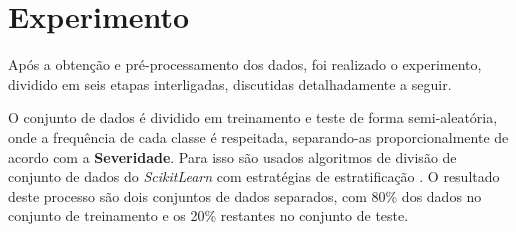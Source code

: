 \section{Experimento}
\label{sec:experimento}

Após a obtenção e pré-processamento dos dados, foi realizado o experimento, dividido em seis etapas interligadas, discutidas detalhadamente a seguir.

O conjunto de dados é dividido em treinamento e teste de forma semi-aleatória, onde a frequência de cada classe é respeitada, separando-as proporcionalmente de acordo com a \textbf{Severidade}. Para isso são usados algoritmos de divisão de conjunto de dados do \textit{ScikitLearn} com estratégias de estratificação \cite{sklearn}. O resultado deste processo são dois conjuntos de dados separados, com 80\% dos dados no conjunto de treinamento e os 20\% restantes no conjunto de teste.














